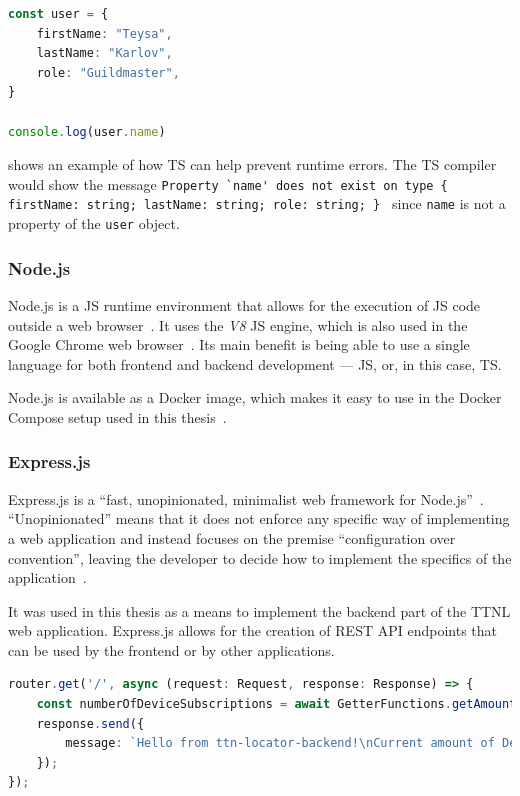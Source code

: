 \begin{lstlisting}[language=TypeScript, float, caption={Example of type checking in \ac{TS}}, label={lst:example-ts-type-checking}]
const user = {
    firstName: "Teysa",
    lastName: "Karlov",
    role: "Guildmaster",
}
    
console.log(user.name)
\end{lstlisting}

 shows an example of how \ac{TS} can help prevent runtime errors.
The \ac{TS} compiler would show the message \lstinline|Property `name' does not exist on type { firstName: string; lastName: string; role: string; } | since \lstinline{name} is not a property of the \lstinline{user} object.

\subsubsection{Node.js}\label{sec:nodejs}

Node.js is a \ac{JS} runtime environment that allows for the execution of \ac{JS} code outside a web browser~\cite{noauthor_nodejs_nodate}.
It uses the \emph{V8} \ac{JS} engine, which is also used in the Google Chrome web browser~\cite{noauthor_v8_nodate}.
Its main benefit is being able to use a single language for both frontend and backend development --- \ac{JS}, or, in this case, \ac{TS}.

Node.js is available as a Docker image, which makes it easy to use in the Docker Compose setup used in this thesis~\cite{docker_inc_node_2023}.

\subsubsection{Express.js}

Express.js is a ``fast, unopinionated, minimalist web framework for Node.js''~\cite{noauthor_express_nodate}.
``Unopinionated'' means that it does not enforce any specific way of implementing a web application and instead focuses on the premise ``configuration over convention'', leaving the developer to decide how to implement the specifics of the application~\cite{mardan_pro_2014}.

It was used in this thesis as a means to implement the backend part of the \ac{TTNL} web application.
Express.js allows for the creation of \ac{REST} \ac{API} endpoints that can be used by the frontend or by other applications.

\begin{lstlisting}[language=TypeScript, float, caption={Example of an Express.js \ac{API} endpoint}, label={lst:express-api-endpoint}]
router.get('/', async (request: Request, response: Response) => {
    const numberOfDeviceSubscriptions = await GetterFunctions.getAmountOfDeviceSubscriptions();
    response.send({
        message: `Hello from ttn-locator-backend!\nCurrent amount of Device subscriptions: ${numberOfDeviceSubscriptions}`,
    });
});
\end{lstlisting}

